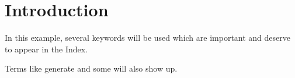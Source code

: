 \documentclass{article}
\begin{document}
\section{Introduction}
In this example, several keywords will be used 
which are important and deserve to appear in the Index.

Terms like generate and some will 
also show up. 

\printindex
\end{document}
